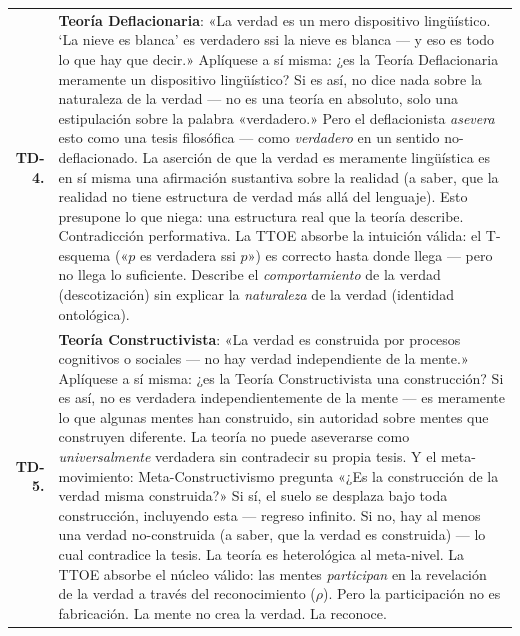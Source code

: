 \documentclass[10pt, openany, oneside]{book}
\renewcommand{\footnotesize}{\fontsize{8.5}{11}\selectfont}
\begin{document}
\vspace{0.5em}

{\footnotesize
\noindent\begin{tabular}{r p{}}
\textbf{TD-4.} & \textbf{Teoría Deflacionaria}: «La verdad es un mero dispositivo lingüístico. `La nieve es blanca' es verdadero ssi la nieve es blanca --- y eso es todo lo que hay que decir.» Aplíquese a sí misma: ¿es la Teoría Deflacionaria meramente un dispositivo lingüístico? Si es así, no dice nada sobre la naturaleza de la verdad --- no es una teoría en absoluto, solo una estipulación sobre la palabra «verdadero.» Pero el deflacionista \textit{asevera} esto como una tesis filosófica --- como \textit{verdadero} en un sentido no-deflacionado. La aserción de que la verdad es meramente lingüística es en sí misma una afirmación sustantiva sobre la realidad (a saber, que la realidad no tiene estructura de verdad más allá del lenguaje). Esto presupone lo que niega: una estructura real que la teoría describe. Contradicción performativa. La TTOE absorbe la intuición válida: el T-esquema («$p$ es verdadera ssi $p$») es correcto hasta donde llega --- pero no llega lo suficiente. Describe el \textit{comportamiento} de la verdad (descotización) sin explicar la \textit{naturaleza} de la verdad (identidad ontológica). \\[0.5em]
\textbf{TD-5.} & \textbf{Teoría Constructivista}: «La verdad es construida por procesos cognitivos o sociales --- no hay verdad independiente de la mente.» Aplíquese a sí misma: ¿es la Teoría Constructivista una construcción? Si es así, no es verdadera independientemente de la mente --- es meramente lo que algunas mentes han construido, sin autoridad sobre mentes que construyen diferente. La teoría no puede aseverarse como \textit{universalmente} verdadera sin contradecir su propia tesis. Y el meta-movimiento: Meta-Constructivismo pregunta «¿Es la construcción de la verdad misma construida?» Si sí, el suelo se desplaza bajo toda construcción, incluyendo esta --- regreso infinito. Si no, hay al menos una verdad no-construida (a saber, que la verdad es construida) --- lo cual contradice la tesis. La teoría es heterológica al meta-nivel. La TTOE absorbe el núcleo válido: las mentes \textit{participan} en la revelación de la verdad a través del reconocimiento ($\rho$). Pero la participación no es fabricación. La mente no crea la verdad. La reconoce. \\[0.5em]

\end{tabular}}
\end{document}
